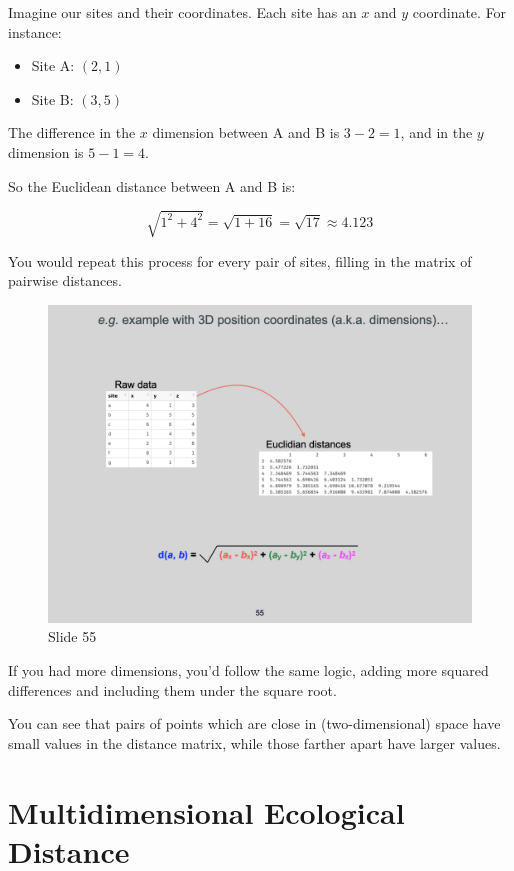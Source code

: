 \documentclass[
  10pt,
]{book}
\providecommand{\tightlist}{%
  \setlength{\itemsep}{0pt}\setlength{\parskip}{0pt}}
\begin{document}
Imagine our sites and their coordinates. Each site has an \(x\) and
\(y\) coordinate. For instance:

\begin{itemize}
\tightlist
\item
  Site A: \((2, 1)\)
\item
  Site B: \((3, 5)\)
\end{itemize}

The difference in the \(x\) dimension between A and B is \(3 - 2 = 1\),
and in the \(y\) dimension is \(5 - 1 = 4\).

So the Euclidean distance between A and B is:

\[
\sqrt{1^2 + 4^2} = \sqrt{1 + 16} = \sqrt{17} \approx 4.123
\]

You would repeat this process for every pair of sites, filling in the
matrix of pairwise distances.

\begin{figure}[ht]
\centering
\includegraphics[width=0.8\linewidth]{../images/BDC334/BDC334-055.jpeg}
\caption*{Slide 55}
\end{figure}

If you had more dimensions, you'd follow the same logic, adding more
squared differences and including them under the square root.

You can see that pairs of points which are close in (two-dimensional)
space have small values in the distance matrix, while those farther
apart have larger values.

\section{Multidimensional Ecological
Distance}\label{multidimensional-ecological-distance}
\end{document}
